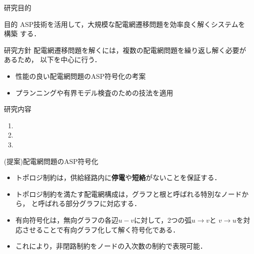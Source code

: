 \documentclass[dvipdfmx,11pt]{beamer}
\begin{document}
\begin{frame}{研究目的}
  \begin{alertblock}{目的}
   ASP技術を活用して，大規模な配電網遷移問題を効率良く解くシステムを構築
   する．
  \end{alertblock}
  \vfill
\begin{exampleblock}{研究方針}
 配電網遷移問題を解くには，複数の配電網問題を繰り返し解く必要があるため，
 以下を中心に行う．
 \begin{itemize}
  \item 性能の良い配電網問題のASP符号化の考案
  \item プランニングや有界モデル検査のための技法を適用
 \end{itemize}

\end{exampleblock}
 \begin{block}{研究内容}
  \begin{enumerate}
   \item {}
   \item {}
   \item {}
  \end{enumerate}
 \end{block}
\end{frame}
\begin{frame}{(提案)配電網問題のASP符号化}

\begin{block}{}
 \begin{itemize}
  \item トポロジ制約は，供給経路内に\textbf{停電}や\textbf{短絡}がないことを保証する．
  \item トポロジ制約を満たす配電網構成は，グラフと根と呼ばれる特別なノードから，
        と呼ばれる部分グラフに対応する．
 \end{itemize}
\end{block}
 \vfill
 \begin{table}[t]
  \centering
  
 \end{table}
 \vfill
 \begin{itemize}
  \item 有向符号化は，無向グラフの各辺$u-v$に対して，2つの弧$u\rightarrow v$と
        $v\rightarrow u$を対応させることで有向グラフ化して解く符号化である．
  \item これにより，非閉路制約をノードの入次数の制約で表現可能．
 \end{itemize}
\end{frame}
\end{document}
